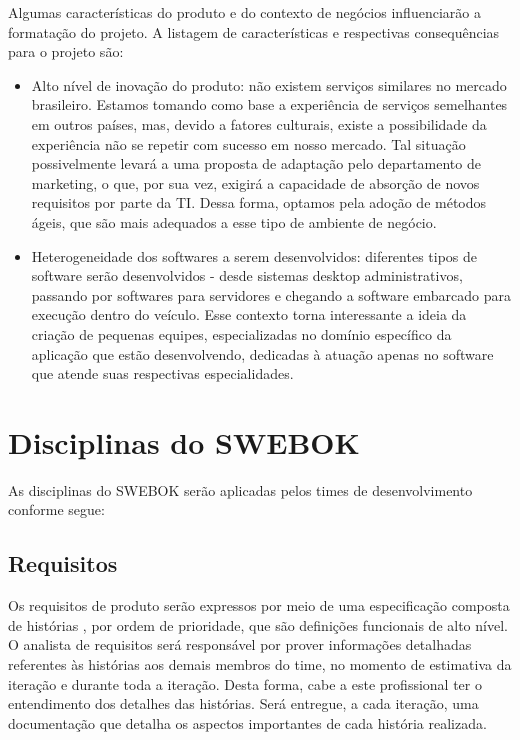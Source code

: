 \documentclass[12pt,journal,compsoc]{IEEEtran}
\begin{document}
Algumas características do produto e do contexto de negócios influenciarão a formatação do projeto. A listagem de características e respectivas consequências para o projeto são:

\begin{itemize}

\item Alto nível de inovação do produto: não existem serviços similares no mercado brasileiro. Estamos tomando como base a experiência de serviços semelhantes em outros países, mas, devido a fatores culturais, existe a possibilidade da experiência não se repetir com sucesso em nosso mercado. Tal situação possivelmente levará a uma proposta de adaptação pelo departamento de marketing, o que, por sua vez, exigirá a capacidade de absorção de novos requisitos por parte da TI. Dessa forma, optamos pela adoção de métodos ágeis, que são mais adequados a esse tipo de ambiente de negócio.

\item Heterogeneidade dos softwares a serem desenvolvidos: diferentes tipos de software serão desenvolvidos - desde sistemas desktop administrativos, passando por softwares para servidores e chegando a software embarcado para execução dentro do veículo. Esse contexto torna interessante a ideia da criação de pequenas equipes, especializadas no domínio específico da aplicação que estão desenvolvendo, dedicadas à atuação apenas no software que atende suas respectivas especialidades.

\end{itemize}

\section{Disciplinas do SWEBOK}

As disciplinas do SWEBOK serão aplicadas pelos times de desenvolvimento conforme segue: 

\subsection{Requisitos}

Os requisitos de produto serão expressos por meio de uma especificação composta
de histórias \cite{primo_user_2011}, por ordem de prioridade, que são definições funcionais de alto
nível. O analista de requisitos será responsável por prover informações
detalhadas referentes às histórias aos demais membros do time, no momento de
estimativa da iteração e durante toda a iteração. Desta forma, cabe a este
profissional ter o entendimento dos detalhes das histórias. Será entregue, a
cada iteração, uma documentação que detalha os aspectos importantes de cada
história realizada. 
\end{document}

